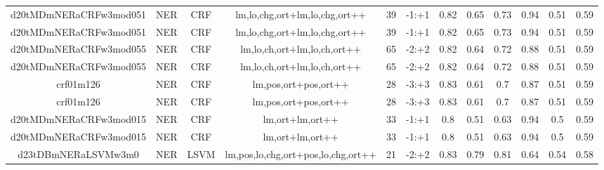 \documentclass[a4paper]{article}
\begin{document}
\begin{landscape}
\begin{center}
\begin{tabular}{ |c|c|c|c|c|c|c|c|c|c|c|c|}
 	
 
 	
 		
 		\small{ d20tMDmNERaCRFw3mod051 } & NER & CRF & lm,lo,chg,ort+lm,lo,chg,ort++  &  39 &  -1:+1  &  0.82 & 0.65 & 0.73  &  0.94 & 0.51 & 0.59 \\
 		

 	
 
 	
 		
 		\small{ d20tMDmNERaCRFw3mod051 } & NER & CRF & lm,lo,chg,ort+lm,lo,chg,ort++  &  39 &  -1:+1  &  0.82 & 0.65 & 0.73  &  0.94 & 0.51 & 0.59 \\
 		

 	
 
 	
 		
 		\small{ d20tMDmNERaCRFw3mod055 } & NER & CRF & lm,lo,ch,ort+lm,lo,ch,ort++  &  65 &  -2:+2  &  0.82 & 0.64 & 0.72  &  0.88 & 0.51 & 0.59 \\
 		

 	
 
 	
 		
 		\small{ d20tMDmNERaCRFw3mod055 } & NER & CRF & lm,lo,ch,ort+lm,lo,ch,ort++  &  65 &  -2:+2  &  0.82 & 0.64 & 0.72  &  0.88 & 0.51 & 0.59 \\
 		

 	
 
 	
 		
 		\small{ crf01m126 } & NER & CRF & lm,pos,ort+pos,ort++  &  28 &  -3:+3  &  0.83 & 0.61 & 0.7  &  0.87 & 0.51 & 0.59 \\
 		

 	
 
 	
 		
 		\small{ crf01m126 } & NER & CRF & lm,pos,ort+pos,ort++  &  28 &  -3:+3  &  0.83 & 0.61 & 0.7  &  0.87 & 0.51 & 0.59 \\
 		

 	
 
 	
 		
 		\small{ d20tMDmNERaCRFw3mod015 } & NER & CRF & lm,ort+lm,ort++  &  33 &  -1:+1  &  0.8 & 0.51 & 0.63  &  0.94 & 0.5 & 0.59 \\
 		

 	
 
 	
 		
 		\small{ d20tMDmNERaCRFw3mod015 } & NER & CRF & lm,ort+lm,ort++  &  33 &  -1:+1  &  0.8 & 0.51 & 0.63  &  0.94 & 0.5 & 0.59 \\
 		

 	
 
 	
 		
 		\small{ d23tDBmNERaLSVMw3m0 } & NER & LSVM & lm,pos,lo,chg,ort+pos,lo,chg,ort++  &  21 &  -2:+2  &  0.83 & 0.79 & 0.81  &  0.64 & 0.54 & 0.58 \\
 		


\end{tabular}
\end{center}
\end{landscape}
\end{document}
